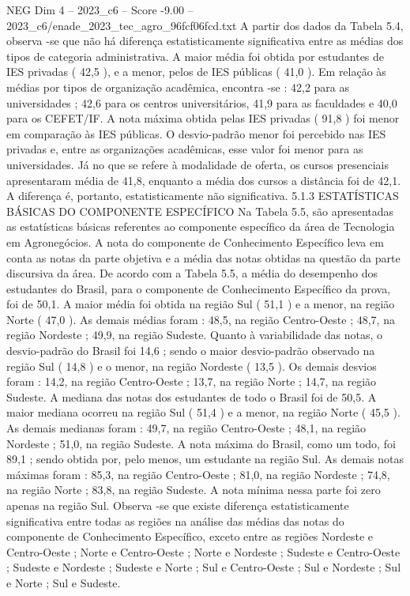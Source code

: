 \begin{textsample}{NEG Dim 4 – 2023\_c6 – Score -9.00 – 2023\_c6/enade\_2023\_tec\_agro\_96fcf06fcd.txt}
A partir dos dados da Tabela 5.4, observa -se que não há diferença estatisticamente significativa entre as médias dos tipos de categoria administrativa.
A maior média foi obtida por estudantes de IES privadas ( 42,5 ), e a menor, pelos de IES públicas ( 41,0 ).
Em relação às médias por tipos de organização acadêmica, encontra -se : 42,2 para as universidades ; 42,6 para os centros universitários, 41,9 para as faculdades e 40,0 para os CEFET/IF.
A nota máxima obtida pelas IES privadas ( 91,8 ) foi menor em comparação às IES públicas.
O desvio-padrão menor foi percebido nas IES privadas e, entre as organizações acadêmicas, esse valor foi menor para as universidades.
Já no que se refere à modalidade de oferta, os cursos presenciais apresentaram média de 41,8, enquanto a média dos cursos a distância foi de 42,1.
A diferença é, portanto, estatisticamente não significativa. 5.1.3 ESTATÍSTICAS BÁSICAS DO COMPONENTE ESPECÍFICO Na Tabela 5.5, são apresentadas as estatísticas básicas referentes ao componente específico da área de Tecnologia em Agronegócios.
A nota do componente de Conhecimento Específico leva em conta as notas da parte objetiva e a média das notas obtidas na questão da parte discursiva da área.
De acordo com a Tabela 5.5, a média do desempenho dos estudantes do Brasil, para o componente de Conhecimento Específico da prova, foi de 50,1.
A maior média foi obtida na região Sul ( 51,1 ) e a menor, na região Norte ( 47,0 ).
As demais médias foram : 48,5, na região Centro-Oeste ; 48,7, na região Nordeste ; 49,9, na região Sudeste.
Quanto à variabilidade das notas, o desvio-padrão do Brasil foi 14,6 ; sendo o maior desvio-padrão observado na região Sul ( 14,8 ) e o menor, na região Nordeste ( 13,5 ).
Os demais desvios foram : 14,2, na região Centro-Oeste ; 13,7, na região Norte ; 14,7, na região Sudeste.
A mediana das notas dos estudantes de todo o Brasil foi de 50,5.
A maior mediana ocorreu na região Sul ( 51,4 ) e a menor, na região Norte ( 45,5 ).
As demais medianas foram : 49,7, na região Centro-Oeste ; 48,1, na região Nordeste ; 51,0, na região Sudeste.
A nota máxima do Brasil, como um todo, foi 89,1 ; sendo obtida por, pelo menos, um estudante na região Sul.
As demais notas máximas foram : 85,3, na região Centro-Oeste ; 81,0, na região Nordeste ; 74,8, na região Norte ; 83,8, na região Sudeste.
A nota mínima nessa parte foi zero apenas na região Sul.
Observa -se que existe diferença estatisticamente significativa entre todas as regiões na análise das médias das notas do componente de Conhecimento Específico, exceto entre as regiões Nordeste e Centro-Oeste ; Norte e Centro-Oeste ; Norte e Nordeste ; Sudeste e Centro-Oeste ; Sudeste e Nordeste ; Sudeste e Norte ; Sul e Centro-Oeste ; Sul e Nordeste ; Sul e Norte ; Sul e Sudeste.

\end{textsample}
